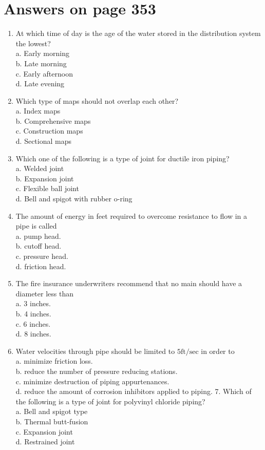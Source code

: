 \documentclass[10pt]{article}
\begin{document}
\section{Answers on page 353}
\begin{enumerate}
  \item At which time of day is the age of the water stored in the distribution system the lowest?\\
a. Early morning\\
b. Late morning\\
c. Early afternoon\\
d. Late evening

  \item Which type of maps should not overlap each other?\\
a. Index maps\\
b. Comprehensive maps\\
c. Construction maps\\
d. Sectional maps

  \item Which one of the following is a type of joint for ductile iron piping?\\
a. Welded joint\\
b. Expansion joint\\
c. Flexible ball joint\\
d. Bell and spigot with rubber o-ring

  \item The amount of energy in feet required to overcome resistance to flow in a pipe is called\\
a. pump head.\\
b. cutoff head.\\
c. pressure head.\\
d. friction head.

  \item The fire insurance underwriters recommend that no main should have a diameter less than\\
a. 3 inches.\\
b. 4 inches.\\
c. 6 inches.\\
d. 8 inches.

  \item Water velocities through pipe should be limited to $5 \mathrm{ft} / \mathrm{sec}$ in order to\\
a. minimize friction loss.\\
b. reduce the number of pressure reducing stations.\\
c. minimize destruction of piping appurtenances.\\
d. reduce the amount of corrosion inhibitors applied to piping. 7. Which of the following is a type of joint for polyvinyl chloride piping?\\
a. Bell and spigot type\\
b. Thermal butt-fusion\\
c. Expansion joint\\
d. Restrained joint


\end{enumerate}
\end{document}

